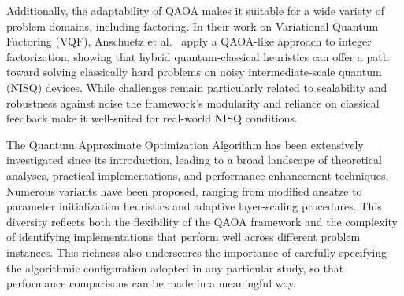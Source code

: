 Additionally, the adaptability of QAOA makes it suitable for a wide variety of problem domains,
including factoring. In their work on Variational Quantum Factoring (VQF), Anschuetz et
al.~\cite{anschuetz_variational_2018} apply a QAOA-like approach to integer factorization,
showing that hybrid quantum-classical heuristics can offer a path toward solving classically
hard problems on noisy intermediate-scale quantum (NISQ) devices. While challenges
remain particularly related to scalability and robustness against noise the framework's
modularity and reliance on classical feedback make it well-suited for real-world NISQ conditions.

The Quantum Approximate Optimization Algorithm has been extensively investigated
since its introduction, leading to a broad landscape of theoretical analyses, practical 
implementations, and performance-enhancement techniques. Numerous variants have been proposed,
ranging from modified ansatze to parameter initialization heuristics and adaptive layer-scaling
procedures. This diversity reflects both the flexibility of the QAOA framework and the
complexity of identifying implementations that perform well across different problem
instances. This richness also underscores the importance of carefully specifying the
algorithmic configuration adopted in any particular study, so that performance comparisons
can be made in a meaningful way.